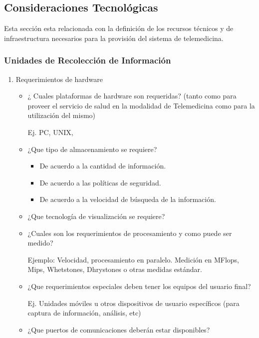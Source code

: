 \subsection{Consideraciones Tecnológicas}

Esta sección esta relacionada con la definición de los recursos técnicos y de infraestructura necesarios para la provisión del sistema de telemedicina.

\subsubsection{Unidades de Recolección de Información}

\begin{enumerate}
\item Requerimientos de hardware

\begin{itemize}
\item ¿ Cuales plataformas de hardware son requeridas? (tanto como para proveer el servicio de salud en la modalidad de Telemedicina como para la utilización del mismo)

Ej.  PC, UNIX,  
\item  ¿Que tipo de almacenamiento se requiere? 
\begin{itemize}
\item  De acuerdo a la cantidad de información.
\item  De acuerdo a las políticas de seguridad.
\item  De acuerdo a la velocidad de búsqueda de la información.
\end{itemize}

\item  ¿Que tecnología de visualización se requiere?

\item  ¿Cuales son los requerimientos de procesamiento y como puede ser medido?
 

Ejemplo: Velocidad, procesamiento en paralelo. Medición en MFlops, Mips, Whetstones, Dhrystones o otras medidas estándar. 

\item ¿Que requerimientos especiales deben tener los equipos del usuario final?

Ej. Unidades móviles u otros dispositivos de usuario específicos (para captura de información, análisis, etc)

\item ¿Que puertos de comunicaciones deberán estar disponibles? 


\end{itemize}
\end{enumerate}
